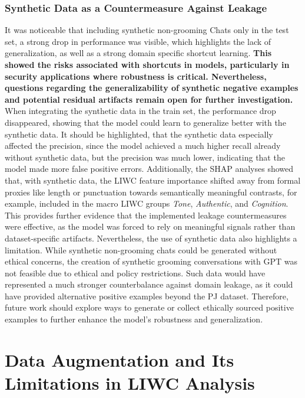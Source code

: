 \subsubsection{Synthetic Data as a Countermeasure Against Leakage}
It was noticeable that including synthetic non-grooming Chats only in the test set, a strong drop in performance was visible, which highlights the lack of generalization, as well as a strong domain specific shortcut learning. \textbf{This showed the risks associated with shortcuts in models, particularly in security applications where robustness is critical. Nevertheless, questions regarding the generalizability of synthetic negative examples and potential residual artifacts remain open for further investigation.} When integrating the synthetic data in the train set, the performance drop disappeared, showing that the model could learn to generalize better with the synthetic data. It should be highlighted, that the synthetic data especially affected the precision, since the model achieved a much higher recall already without synthetic data, but the precision was much lower, indicating that the model made more false positive errors. Additionally, the SHAP analyses showed that, with synthetic data, the LIWC feature importance shifted away from formal proxies like length or punctuation towards semantically meaningful contrasts, for example, included in the macro LIWC groups \textit{Tone}, \textit{Authentic}, and \textit{Cognition}. This provides further evidence that the implemented leakage countermeasures were effective, as the model was forced to rely on meaningful signals rather than dataset-specific artifacts. Nevertheless, the use of synthetic data also highlights a limitation. While synthetic non-grooming chats could be generated without ethical concerns, the creation of synthetic grooming conversations with GPT was not feasible due to ethical and policy restrictions. Such data would have represented a much stronger counterbalance against domain leakage, as it could have provided alternative positive examples beyond the PJ dataset. Therefore, future work should explore ways to generate or collect ethically sourced positive examples to further enhance the model's robustness and generalization.
\section{Data Augmentation and Its Limitations in LIWC Analysis}


